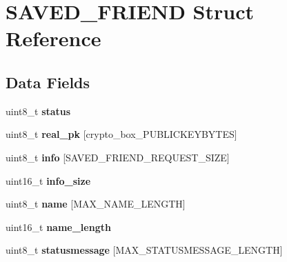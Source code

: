 \hypertarget{struct_s_a_v_e_d___f_r_i_e_n_d}{\section{S\+A\+V\+E\+D\+\_\+\+F\+R\+I\+E\+N\+D Struct Reference}
\label{struct_s_a_v_e_d___f_r_i_e_n_d}
}
\subsection*{Data Fields}
\begin{DoxyCompactItemize}
\item 
\hypertarget{struct_s_a_v_e_d___f_r_i_e_n_d_ade818037fd6c985038ff29656089758d}{uint8\+\_\+t {\bfseries status}}\label{struct_s_a_v_e_d___f_r_i_e_n_d_ade818037fd6c985038ff29656089758d}

\item 
\hypertarget{struct_s_a_v_e_d___f_r_i_e_n_d_ab42b4c90d81ac99b968c3edd1e21d706}{uint8\+\_\+t {\bfseries real\+\_\+pk} \mbox{[}crypto\+\_\+box\+\_\+\+P\+U\+B\+L\+I\+C\+K\+E\+Y\+B\+Y\+T\+E\+S\mbox{]}}\label{struct_s_a_v_e_d___f_r_i_e_n_d_ab42b4c90d81ac99b968c3edd1e21d706}

\item 
\hypertarget{struct_s_a_v_e_d___f_r_i_e_n_d_a30d0b669f0c53df867104ef9fc4ca5ac}{uint8\+\_\+t {\bfseries info} \mbox{[}S\+A\+V\+E\+D\+\_\+\+F\+R\+I\+E\+N\+D\+\_\+\+R\+E\+Q\+U\+E\+S\+T\+\_\+\+S\+I\+Z\+E\mbox{]}}\label{struct_s_a_v_e_d___f_r_i_e_n_d_a30d0b669f0c53df867104ef9fc4ca5ac}

\item 
\hypertarget{struct_s_a_v_e_d___f_r_i_e_n_d_ac0ae002db55ef8f8366de10ec005b65a}{uint16\+\_\+t {\bfseries info\+\_\+size}}\label{struct_s_a_v_e_d___f_r_i_e_n_d_ac0ae002db55ef8f8366de10ec005b65a}

\item 
\hypertarget{struct_s_a_v_e_d___f_r_i_e_n_d_a11b8cc6595eea79e65c978209278e683}{uint8\+\_\+t {\bfseries name} \mbox{[}M\+A\+X\+\_\+\+N\+A\+M\+E\+\_\+\+L\+E\+N\+G\+T\+H\mbox{]}}\label{struct_s_a_v_e_d___f_r_i_e_n_d_a11b8cc6595eea79e65c978209278e683}

\item 
\hypertarget{struct_s_a_v_e_d___f_r_i_e_n_d_a3573d7a906b26e9999cd74f2c4066601}{uint16\+\_\+t {\bfseries name\+\_\+length}}\label{struct_s_a_v_e_d___f_r_i_e_n_d_a3573d7a906b26e9999cd74f2c4066601}

\item 
\hypertarget{struct_s_a_v_e_d___f_r_i_e_n_d_a8f12612ac1191135a1a5b1cbcbc82852}{uint8\+\_\+t {\bfseries statusmessage} \mbox{[}M\+A\+X\+\_\+\+S\+T\+A\+T\+U\+S\+M\+E\+S\+S\+A\+G\+E\+\_\+\+L\+E\+N\+G\+T\+H\mbox{]}}\label{struct_s_a_v_e_d___f_r_i_e_n_d_a8f12612ac1191135a1a5b1cbcbc82852}


\end{DoxyCompactItemize}
